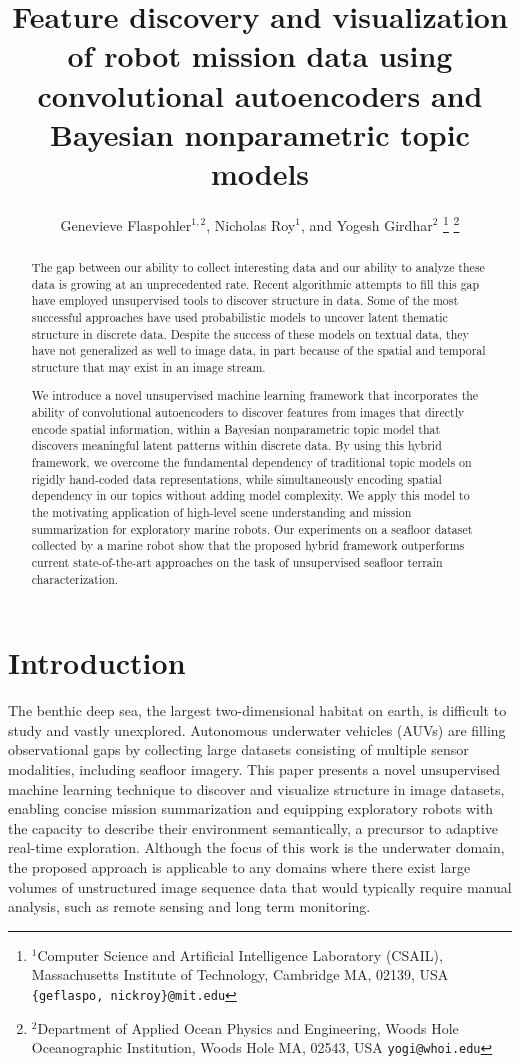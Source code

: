 \documentclass[letterpaper, 10 pt, conference]{ieeeconf}
\title{\LARGE \bf
Feature discovery and visualization of robot mission data using convolutional autoencoders and Bayesian nonparametric topic models
}
\author{Genevieve Flaspohler$^{1, 2}$, Nicholas Roy$^{1}$, and Yogesh Girdhar$^{2}$%
\thanks{$^{1}$Computer Science and Artificial Intelligence Laboratory (CSAIL), Massachusetts Institute of Technology, Cambridge MA, 02139, USA {\tt\small \{geflaspo, nickroy\}@mit.edu}}%
\thanks{$^{2}$Department of Applied Ocean Physics and Engineering, Woods Hole
Oceanographic Institution, Woods Hole MA, 02543, USA {\tt\small yogi@whoi.edu}}%
}
\begin{document}
\maketitle
\thispagestyle{empty}
\pagestyle{empty}

\begin{abstract}
The gap between our ability to collect interesting data and our ability to analyze these data is growing at an unprecedented rate. Recent algorithmic attempts to fill this gap have employed unsupervised tools to discover structure in data. Some of the most successful approaches have used probabilistic models to uncover latent thematic structure in discrete data. Despite the success of these models on textual data, they have not generalized as well to image data, in part because of the spatial and temporal structure that may exist in an image stream.
    
We introduce a novel unsupervised machine learning framework that incorporates the ability of convolutional autoencoders to discover features from images that directly encode spatial information, within a Bayesian nonparametric topic model that discovers meaningful latent patterns within discrete data. By using this hybrid framework, we overcome the fundamental dependency of traditional topic models on rigidly hand-coded data representations, while simultaneously encoding spatial dependency in our topics without adding model complexity. We apply this model to the motivating application of high-level scene understanding and mission summarization for exploratory marine robots. Our experiments on a seafloor dataset collected by a marine robot show that the proposed hybrid framework outperforms current state-of-the-art approaches on the task of unsupervised seafloor terrain characterization. 
\end{abstract}

\section{Introduction}
The benthic deep sea, the largest two-dimensional habitat on earth, is difficult to study and vastly unexplored. Autonomous underwater vehicles (AUVs) are filling observational gaps by collecting large datasets consisting of multiple sensor modalities, including seafloor imagery.  This paper presents a novel unsupervised machine learning technique to discover and visualize structure in image datasets, enabling concise mission summarization and equipping exploratory robots with the capacity to describe their environment semantically, a precursor to adaptive real-time exploration.  Although the focus of this work is the underwater domain, the proposed approach is applicable to any domains where there exist large volumes of unstructured image sequence data that would typically require manual analysis, such as remote sensing and long term monitoring. 
\end{document}
